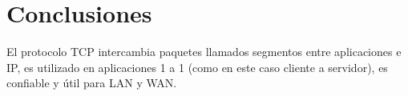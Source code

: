 \section{Conclusiones}
    El protocolo TCP intercambia paquetes llamados segmentos entre aplicaciones e IP, es utilizado en aplicaciones 1 a 1 (como en este caso cliente a servidor), es confiable y útil para LAN y WAN.
\\